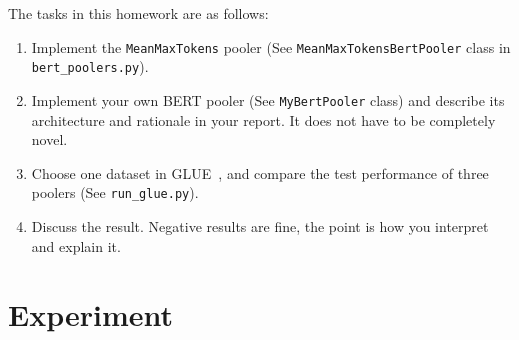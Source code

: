 \documentclass[UTF8]{article}
\begin{document}
The tasks in this homework are as follows:
\begin{enumerate}
  \item Implement the \texttt{MeanMaxTokens} pooler (See \texttt{MeanMaxTokensBertPooler} class in \texttt{bert\_poolers.py}).
  \item Implement your own BERT pooler (See \texttt{MyBertPooler} class) and describe its architecture and rationale in your report. It does not have to be completely novel.
  \item Choose one dataset in GLUE~\cite{wang2018glue}, and compare the test performance of three poolers (See \texttt{run\_glue.py}).
  \item Discuss the result. Negative results are fine, the point is how you interpret and explain it.
\end{enumerate}

\section{Experiment}


\end{document}
